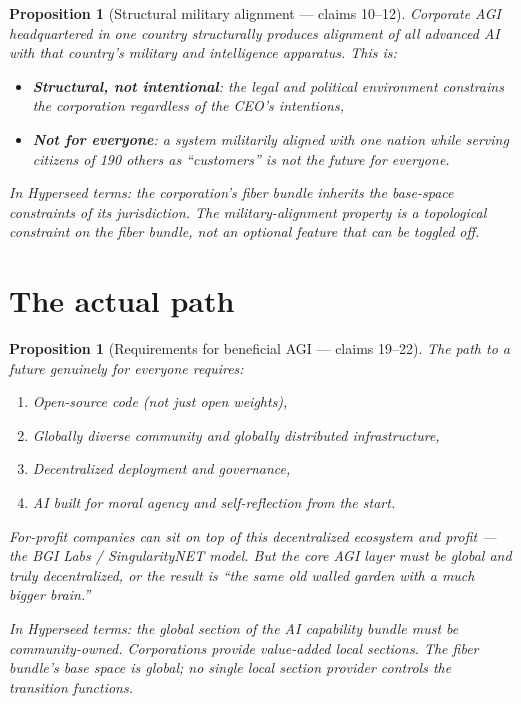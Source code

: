 \documentclass[11pt,a4paper]{article}
\newtheorem{proposition}[definition]{Proposition}
\begin{document}
\begin{proposition}[Structural military alignment --- claims 10--12]
\label{prop:military}
Corporate AGI headquartered in one country structurally produces
alignment of all advanced AI with that country's military and
intelligence apparatus. This is:
\begin{itemize}
\item \textbf{Structural, not intentional}: the legal and political
  environment constrains the corporation regardless of the CEO's
  intentions,
\item \textbf{Not for everyone}: a system militarily aligned with one
  nation while serving citizens of 190 others as ``customers'' is not
  the future for everyone.
\end{itemize}
In Hyperseed terms: the corporation's fiber bundle inherits the
base-space constraints of its jurisdiction. The military-alignment
property is a topological constraint on the fiber bundle, not an
optional feature that can be toggled off.
\end{proposition}


\section{The actual path}
\label{sec:path}

\begin{proposition}[Requirements for beneficial AGI --- claims 19--22]
\label{prop:path}
The path to a future genuinely for everyone requires:
\begin{enumerate}
\item Open-source code (not just open weights),
\item Globally diverse community and globally distributed infrastructure,
\item Decentralized deployment and governance,
\item AI built for moral agency and self-reflection from the start.
\end{enumerate}
For-profit companies can sit on top of this decentralized ecosystem
and profit --- the BGI Labs / SingularityNET model. But the core AGI
layer must be global and truly decentralized, or the result is ``the
same old walled garden with a much bigger brain.''

In Hyperseed terms: the global section of the AI capability bundle
must be community-owned. Corporations provide value-added local
sections. The fiber bundle's base space is global; no single local
section provider controls the transition functions.
\end{proposition}
\end{document}
